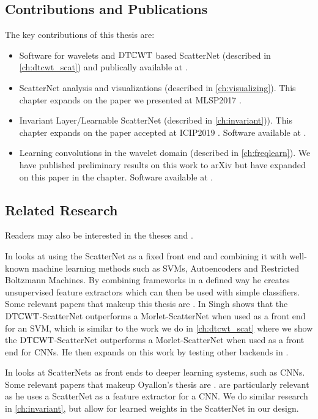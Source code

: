 \subsection{Contributions and Publications}
The key contributions of this thesis are:

\begin{itemize}
  \item Software for wavelets and $\mathrm{DT}\mathbb{C}\mathrm{WT}$ based ScatterNet (described in \autoref{ch:dtcwt_scat})
    and publically available at \cite{cotter_pytorch_2018}.
  \item ScatterNet analysis and visualizations (described in
    \autoref{ch:visualizing}). This chapter expands on the paper we presented at MLSP2017 
    \cite{cotter_visualizing_2017}.
  \item Invariant Layer/Learnable ScatterNet (described in \autoref{ch:invariant})). This chapter expands 
    on the paper accepted at ICIP2019 \cite{cotter_learnable_2019}. Software
    available at \cite{cotter_learnable_2019-1}.
  \item Learning convolutions in the wavelet domain (described in
    \autoref{ch:freqlearn}). We have published preliminary results on this work
    to arXiv \cite{cotter_deep_2018} but have expanded on this paper in the
    chapter. Software available at \cite{cotter_dtcwt_2018}.
\end{itemize}

\subsection{Related Research}
Readers may also be interested in the theses \cite{singh_scatternet_2018} and
\cite{oyallon_analyzing_2017}. 

In \cite{singh_scatternet_2018}
\citeauthor{singh_scatternet_2018} looks at using the ScatterNet as a fixed
front end and combining it with well-known machine learning methods such as
SVMs, Autoencoders and Restricted Boltzmann Machines. By combining frameworks in
a defined way he creates unsupervised feature extractors which can then be used
with simple classifiers. Some relevant papers that makeup this thesis are \cite{singh_multi-resolution_2016, 
singh_scatternet_2017, singh_generative_2018}. In
\cite{singh_multi-resolution_2016} Singh shows 
that the $\mathrm{DT}\mathbb{C}\mathrm{WT}$-ScatterNet outperforms a Morlet-ScatterNet when used as a front end for
an SVM, which is similar to the work we do in \autoref{ch:dtcwt_scat} where we
show the $\mathrm{DT}\mathbb{C}\mathrm{WT}$-ScatterNet outperforms a Morlet-ScatterNet when used as a
front end for CNNs. He then expands on this work by testing other backends in
\cite{singh_scatternet_2017, singh_generative_2018}. 

In \cite{oyallon_analyzing_2017}
\citeauthor{oyallon_analyzing_2017} looks at ScatterNets as front ends to
deeper learning systems, such as CNNs. Some relevant papers that makeup Oyallon's thesis are
\cite{oyallon_deep_2015, oyallon_scaling_2017, oyallon_hybrid_2017}. \cite{oyallon_scaling_2017, oyallon_hybrid_2017} 
are particularly relevant as he uses a ScatterNet as a feature extractor for a
CNN. We do similar research in \autoref{ch:invariant}, but allow for
learned weights in the ScatterNet in our design.
